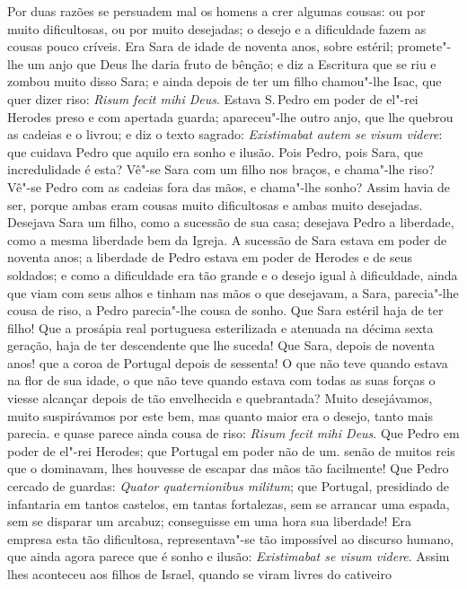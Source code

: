 Por duas razões se persuadem mal os homens a crer algumas cousas: ou por
muito dificultosas, ou por muito desejadas; o desejo e a dificuldade
fazem as cousas pouco críveis. Era Sara de idade de noventa anos, sobre
estéril; promete"-lhe um anjo que Deus lhe daria fruto de bênção; e diz a
Escritura que se riu e zombou muito disso Sara; e ainda depois de ter um
filho chamou"-lhe Isac, que quer dizer riso: \emph{Risum fecit mihi
Deus}. Estava S.\,Pedro em poder de el"-rei Herodes preso e com apertada
guarda; apareceu"-lhe outro anjo, que lhe quebrou as cadeias e o livrou;
e diz o texto sagrado: \emph{Existimabat autem se visum videre}: que
cuidava Pedro que aquilo era sonho e ilusão. Pois Pedro, pois Sara,
que incredulidade é esta? Vê"-se Sara com um filho nos braços, e
chama"-lhe riso? Vê"-se Pedro com as cadeias fora das mãos, e chama"-lhe
sonho? Assim havia de ser, porque ambas eram cousas muito
dificultosas e ambas muito desejadas. Desejava Sara um filho, como a
sucessão de sua casa; desejava Pedro a liberdade, como a mesma liberdade
bem da Igreja. A sucessão de Sara estava em poder de noventa anos; a
liberdade de Pedro estava em poder de Herodes e de seus soldados; e como
a dificuldade era tão grande e o desejo igual à dificuldade, ainda que
viam com seus alhos e tinham nas mãos o que desejavam, a Sara,
parecia"-lhe cousa de riso, a Pedro parecia"-lhe cousa de sonho. Que Sara
estéril haja de ter filho! Que a prosápia real portuguesa esterilizada e
atenuada na décima sexta geração, haja de ter descendente que lhe
suceda! Que Sara, depois de noventa anos! que a coroa de Portugal
depois de sessenta! O que não teve quando estava na flor de sua idade, o que não
teve quando estava com todas as suas forças o viesse alcançar depois de
tão envelhecida e quebrantada? Muito desejávamos, muito suspirávamos por
este bem, mas quanto maior era o desejo, tanto mais parecia. e quase parece ainda
cousa de riso: \emph{Risum fecit mihi Deus}. Que Pedro em poder de
el"-rei Herodes; que Portugal em poder não de um. senão de muitos reis
que o dominavam, lhes houvesse de escapar das mãos tão facilmente! Que
Pedro cercado de guardas: \emph{Quator quaternionibus militum}; que
Portugal, presidiado de infantaria em tantos castelos, em tantas
fortalezas, sem se arrancar uma espada, sem se disparar um arcabuz;
conseguisse em uma hora sua liberdade! Era empresa esta tão dificultosa,
representava"-se tão impossível ao discurso humano, que ainda agora
parece que é sonho e ilusão: \emph{Existimabat se visum videre}. Assim
lhes aconteceu aos filhos de Israel, quando se viram livres do cativeiro
